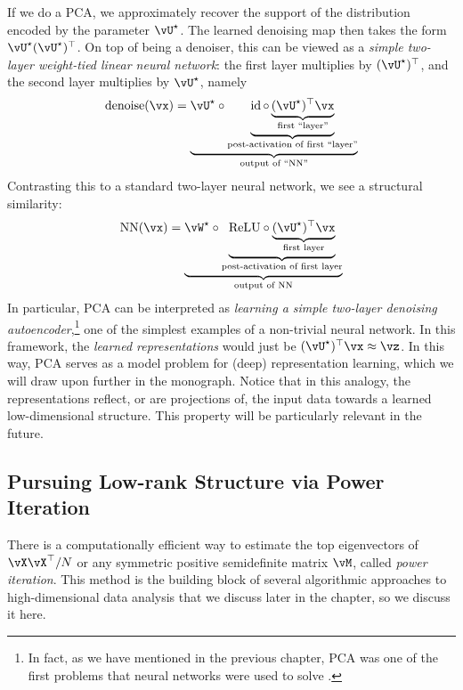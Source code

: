 \documentclass[../../book-main.tex]{subfiles}
\begin{document}
\begin{remark}
    If we do a PCA, we approximately recover the support of the distribution
    encoded by the parameter \(\vU^{\star}\). The learned denoising map then
    takes the form \(\vU^{\star}(\vU^{\star})^{\top}\). On top of being
    a denoiser, this can be viewed as a \textit{simple two-layer weight-tied
    linear neural network}: the first layer multiplies by
    \((\vU^{\star})^{\top}\), and the second layer multiplies by \(\vU^{\star}\), namely
    \begin{equation}
        \operatorname{denoise}(\vx) = \underbrace{\vU^{\star} \circ
        \underbrace{\id \circ \underbrace{(\vU^{\star})^{\top}\vx}_{\text{first ``layer''}}}_{\text{post-activation of first ``layer''}}}_{\text{output of ``NN''}}
    \end{equation}
    Contrasting this to a standard two-layer neural network, we see a structural similarity:
    \begin{equation}
        \operatorname{NN}(\vx) = \underbrace{\vW^{\star} \circ
        \underbrace{\mathrm{ReLU} \circ \underbrace{(\vU^{\star})^{\top}\vx}_{\text{first layer}}}_{\text{post-activation of first layer}}}_{\text{output of NN}}
    \end{equation}
    In particular, PCA can be interpreted as \textit{learning a simple two-layer
    denoising autoencoder},\footnote{In fact, as we have mentioned in the
    previous chapter, PCA was one of the first problems that neural networks
    were used to solve \cite{Oja1982SimplifiedNM,Baldi89}.} one of the simplest
    examples of a non-trivial neural network. In this framework, the
    \textit{learned representations} would just be \((\vU^{\star})^{\top}\vx \approx \vz\). In this way, PCA serves as a model problem for (deep) representation learning, which we will draw upon further in the monograph. Notice that in this analogy, the representations reflect, or are projections of, the input data towards a learned low-dimensional structure. This property will be particularly relevant in the future.
\end{remark}

\subsection{Pursuing Low-rank Structure via Power Iteration}\label{subsec:power iterations}

There is a computationally efficient way to estimate the top eigenvectors of \(\vX\vX^{\top}/N\) or any symmetric positive semidefinite matrix \(\vM\), called \textit{power iteration}. This method is the building block of several algorithmic approaches to high-dimensional data analysis that we discuss later in the chapter, so we discuss it here. 
\end{document}
